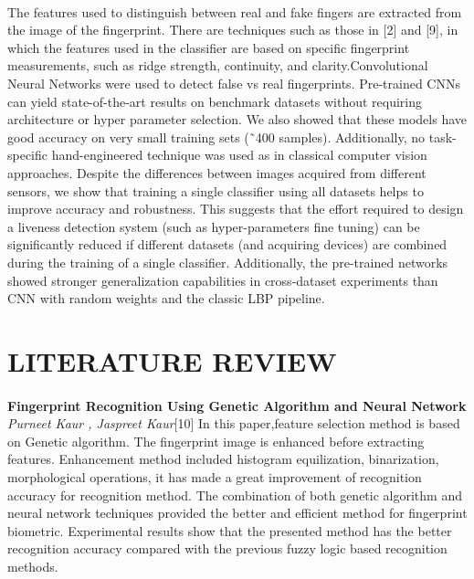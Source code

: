 \documentclass[a4paper,12pt,oneside]{article}
\begin{document}
\paragraph{}
The features used to distinguish between real and fake
fingers are extracted from the image of the fingerprint. There
are techniques such as those in [2] and [9], in which the
features used in the classifier are based on specific fingerprint
measurements, such as ridge strength, continuity, and clarity.Convolutional Neural Networks were used to detect false vs real fingerprints. Pre-trained CNNs can yield state-of-the-art results on benchmark datasets without requiring architecture or hyper parameter selection. We also showed that these models have good accuracy on very small training sets (˜400 samples). Additionally, no task-specific hand-engineered technique was used as in classical computer vision approaches. Despite the differences between images acquired from different sensors, we show that training a single classifier using all datasets helps to improve accuracy and robustness. This suggests that the effort required to design a liveness detection system (such as hyper-parameters fine tuning) can be significantly reduced if different datasets (and acquiring devices) are combined during the training of a single classifier. Additionally, the pre-trained networks showed stronger generalization capabilities in cross-dataset experiments than CNN with random weights and the classic LBP pipeline.




\newpage
\section{LITERATURE REVIEW}
\paragraph{}
\textbf{Fingerprint Recognition Using Genetic Algorithm and Neural Network} \textit{Purneet Kaur , Jaspreet Kaur}[10] In this paper,feature selection method is based on Genetic algorithm. The fingerprint image is enhanced before extracting features. Enhancement method included histogram equilization, binarization, morphological operations, it has made a great improvement of recognition accuracy for recognition method. The combination of both genetic algorithm and neural network techniques provided the better and efficient method for fingerprint biometric. Experimental results show that the presented method has the better recognition accuracy compared with the previous fuzzy logic based recognition methods.
 
\end{document}
